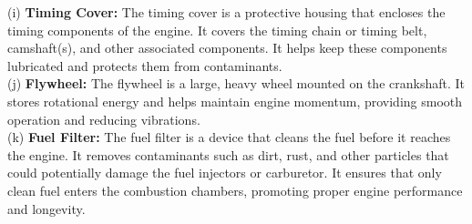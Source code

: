 \documentclass[12pt]{article}
\begin{document}
(i) \textbf{Timing Cover:} The timing cover is a protective housing that encloses the timing components of the engine. It covers the timing chain or timing belt, camshaft(s), and other associated components. It helps keep these components lubricated and protects them from contaminants.\\

(j) \textbf{Flywheel:} The flywheel is a large, heavy wheel mounted on the crankshaft. It stores rotational energy and helps maintain engine momentum, providing smooth operation and reducing vibrations.\\

(k) \textbf{Fuel Filter:} The fuel filter is a device that cleans the fuel before it reaches the engine. It removes contaminants such as dirt, rust, and other particles that could potentially damage the fuel injectors or carburetor. It ensures that only clean fuel enters the combustion chambers, promoting proper engine performance and longevity.\\
\end{document}
